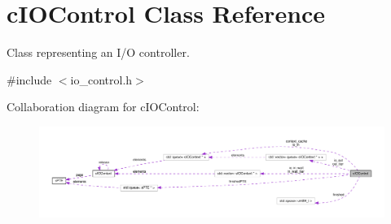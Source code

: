 \hypertarget{classcIOControl}{\section{c\-I\-O\-Control \-Class \-Reference}
\label{da/d8f/classcIOControl}
}


\-Class representing an \-I/\-O controller.  




{\ttfamily \#include $<$io\-\_\-control.\-h$>$}



\-Collaboration diagram for c\-I\-O\-Control\-:\nopagebreak
\begin{figure}[H]
\begin{center}
\leavevmode
\includegraphics[width=350pt]{d5/db8/classcIOControl__coll__graph}
\end{center}
\end{figure}
